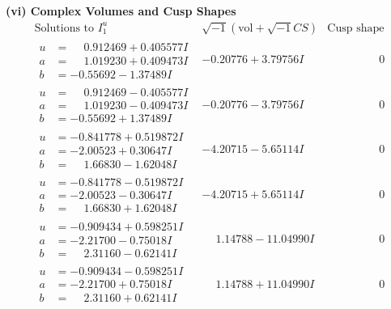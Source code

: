 \documentclass[1p]{elsarticle_modified}
\theoremstyle{definition}
\newcommand{\I}{\sqrt{-1}}
\begin{document}
\newpage\flushleft \textbf{(vi) Complex Volumes and Cusp Shapes}
$$\begin{array}{c|c|c}  
\text{Solutions to }I^u_{1}& \I (\text{vol} + \sqrt{-1}CS) & \text{Cusp shape}\\
 \hline 
\begin{aligned}
u &= \phantom{-}0.912469 + 0.405577 I \\
a &= \phantom{-}1.019230 + 0.409473 I \\
b &= -0.55692 - 1.37489 I\end{aligned}
 & -0.20776 + 3.79756 I & \phantom{-0.000000 } 0 \\ \hline\begin{aligned}
u &= \phantom{-}0.912469 - 0.405577 I \\
a &= \phantom{-}1.019230 - 0.409473 I \\
b &= -0.55692 + 1.37489 I\end{aligned}
 & -0.20776 - 3.79756 I & \phantom{-0.000000 } 0 \\ \hline\begin{aligned}
u &= -0.841778 + 0.519872 I \\
a &= -2.00523 + 0.30647 I \\
b &= \phantom{-}1.66830 - 1.62048 I\end{aligned}
 & -4.20715 - 5.65114 I & \phantom{-0.000000 } 0 \\ \hline\begin{aligned}
u &= -0.841778 - 0.519872 I \\
a &= -2.00523 - 0.30647 I \\
b &= \phantom{-}1.66830 + 1.62048 I\end{aligned}
 & -4.20715 + 5.65114 I & \phantom{-0.000000 } 0 \\ \hline\begin{aligned}
u &= -0.909434 + 0.598251 I \\
a &= -2.21700 - 0.75018 I \\
b &= \phantom{-}2.31160 - 0.62141 I\end{aligned}
 & \phantom{-}1.14788 - 11.04990 I & \phantom{-0.000000 } 0 \\ \hline\begin{aligned}
u &= -0.909434 - 0.598251 I \\
a &= -2.21700 + 0.75018 I \\
b &= \phantom{-}2.31160 + 0.62141 I\end{aligned}
 & \phantom{-}1.14788 + 11.04990 I & \phantom{-0.000000 } 0 \\ \hline\begin{aligned}

\end{aligned}
\end{array}$$
\end{document}
